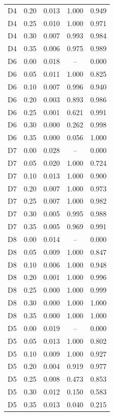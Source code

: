 {\begin{longtable}{llccc}
D4 & 0.20 & 0.013 & 1.000 & 0.949 \\
D4 & 0.25 & 0.010 & 1.000 & 0.971 \\
D4 & 0.30 & 0.007 & 0.993 & 0.984 \\
D4 & 0.35 & 0.006 & 0.975 & 0.989 \\
\addlinespace
D6 & 0.00 & 0.018 & -- & 0.000 \\
D6 & 0.05 & 0.011 & 1.000 & 0.825 \\
D6 & 0.10 & 0.007 & 0.996 & 0.940 \\
D6 & 0.20 & 0.003 & 0.893 & 0.986 \\
D6 & 0.25 & 0.001 & 0.621 & 0.991 \\
D6 & 0.30 & 0.000 & 0.262 & 0.998 \\
D6 & 0.35 & 0.000 & 0.056 & 1.000 \\
\addlinespace
D7 & 0.00 & 0.028 & -- & 0.000 \\
D7 & 0.05 & 0.020 & 1.000 & 0.724 \\
D7 & 0.10 & 0.013 & 1.000 & 0.900 \\
D7 & 0.20 & 0.007 & 1.000 & 0.973 \\
D7 & 0.25 & 0.007 & 1.000 & 0.982 \\
D7 & 0.30 & 0.005 & 0.995 & 0.988 \\
D7 & 0.35 & 0.005 & 0.969 & 0.991 \\
\addlinespace
D8 & 0.00 & 0.014 & -- & 0.000 \\
D8 & 0.05 & 0.009 & 1.000 & 0.847 \\
D8 & 0.10 & 0.006 & 1.000 & 0.948 \\
D8 & 0.20 & 0.001 & 1.000 & 0.996 \\
D8 & 0.25 & 0.000 & 1.000 & 0.999 \\
D8 & 0.30 & 0.000 & 1.000 & 1.000 \\
D8 & 0.35 & 0.000 & 1.000 & 1.000 \\
\addlinespace
D5 & 0.00 & 0.019 & -- & 0.000 \\
D5 & 0.05 & 0.013 & 1.000 & 0.802 \\
D5 & 0.10 & 0.009 & 1.000 & 0.927 \\
D5 & 0.20 & 0.004 & 0.919 & 0.977 \\
D5 & 0.25 & 0.008 & 0.473 & 0.853 \\
D5 & 0.30 & 0.012 & 0.150 & 0.583 \\
D5 & 0.35 & 0.013 & 0.040 & 0.215 \\
\bottomrule
\end{longtable}
}